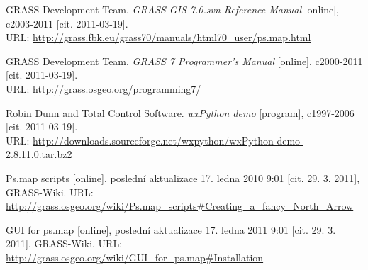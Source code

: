 \documentclass[a4paper,12pt,draft]{article}
\begin{document}
\begin{thebibliography}{9}
\label{literatura}
GRASS Development Team. \textit{GRASS GIS 7.0.svn Reference Manual} [online], c2003-2011 [cit. 2011-03-19].\\ URL: \url{http://grass.fbk.eu/grass70/manuals/html70_user/ps.map.html}

GRASS Development Team. \textit{GRASS 7 Programmer's Manual} [online], c2000-2011 [cit. 2011-03-19].\\ URL: \url{http://grass.osgeo.org/programming7/}

Robin Dunn and Total Control Software. \textit{wxPython demo} [program], c1997-2006 [cit. 2011-03-19].\\ URL: \url{http://downloads.sourceforge.net/wxpython/wxPython-demo-2.8.11.0.tar.bz2}

Ps.map scripts [online], poslední aktualizace 17. ledna 2010 9:01 [cit. 29. 3. 2011], GRASS-Wiki. URL: \url{http://grass.osgeo.org/wiki/Ps.map_scripts#Creating_a_fancy_North_Arrow}

GUI for ps.map [online], poslední aktualizace 17. ledna 2011 9:01 [cit. 29. 3. 2011], GRASS-Wiki. URL: \url{http://grass.osgeo.org/wiki/GUI_for_ps.map#Installation}

\end{thebibliography}
\end{document}

